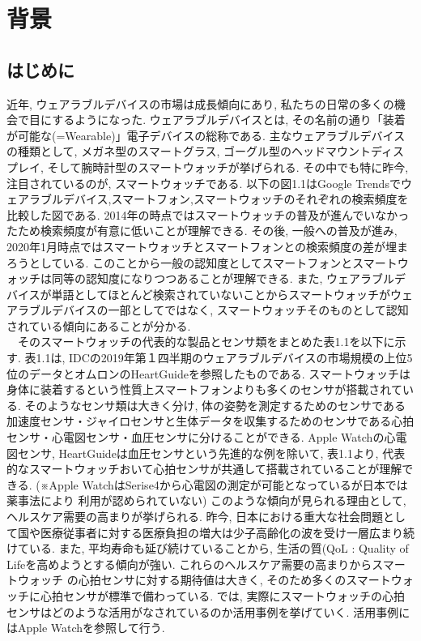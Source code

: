 \documentclass[report, 11pt, a4paper]{jsbook}
\begin{document}
{\large \tableofcontents}
\clearpage

\chapter{背景}
\section{はじめに}
近年, ウェアラブルデバイスの市場は成長傾向にあり\cite{infobook}, 私たちの日常の多くの機会で目にするようになった. ウェアラブルデバイスとは,  その名前の通り「装着が可能な(=Wearable)」電子デバイスの総称である. 主なウェアラブルデバイスの種類として, メガネ型のスマートグラス, ゴーグル型のヘッドマウントディスプレイ, そして腕時計型のスマートウォッチが挙げられる. その中でも特に昨今, 注目されているのが, スマートウォッチである. 以下の図1.1はGoogle Trendsでウェアラブルデバイス,スマートフォン,スマートウォッチのそれぞれの検索頻度を比較した図である. 2014年の時点ではスマートウォッチの普及が進んでいなかったため検索頻度が有意に低いことが理解できる. その後, 一般への普及が進み, 2020年1月時点ではスマートウォッチとスマートフォンとの検索頻度の差が埋まろうとしている. このことから一般の認知度としてスマートフォンとスマートウォッチは同等の認知度になりつつあることが理解できる. また, ウェアラブルデバイスが単語としてほとんど検索されていないことからスマートウォッチがウェアラブルデバイスの一部としてではなく, スマートウォッチそのものとして認知されている傾向にあることが分かる.\\
　そのスマートウォッチの代表的な製品とセンサ類をまとめた表1.1を以下に示す. 表1.1は, IDCの2019年第１四半期のウェアラブルデバイスの市場規模の上位5位のデータ\cite{market}とオムロンのHeartGuideを参照したものである. スマートウォッチは身体に装着するという性質上スマートフォンよりも多くのセンサが搭載されている. そのようなセンサ類は大きく分け, 体の姿勢を測定するためのセンサである加速度センサ・ジャイロセンサと生体データを収集するためのセンサである心拍センサ・心電図センサ・血圧センサに分けることができる. Apple Watchの心電図センサ, HeartGuideは血圧センサという先進的な例を除いて, 表1.1より, 代表的なスマートウォッチおいて心拍センサが共通して搭載されていることが理解できる. (※Apple WatchはSerise4から心電図の測定が可能となっているが日本では薬事法により
利用が認められていない) このような傾向が見られる理由として, ヘルスケア需要の高まりが挙げられる. 昨今, 日本における重大な社会問題として国や医療従事者に対する医療負担の増大は少子高齢化の波を受け一層広まり続けている. また, 平均寿命も延び続けていることから, 生活の質(QoL : Quality of Lifeを高めようとする傾向が強い. これらのヘルスケア需要の高まりからスマートウォッチ の心拍センサに対する期待値は大きく, そのため多くのスマートウォッチに心拍センサが標準で備わっている. では, 実際にスマートウォッチの心拍センサはどのような活用がなされているのか活用事例を挙げていく. 活用事例にはApple Watchを参照して行う.\\
\end{document}
